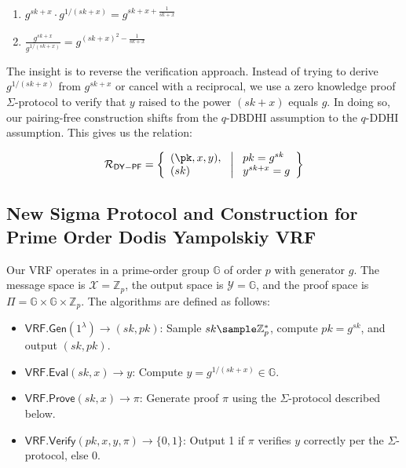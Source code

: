 \begin{enumerate}
    \item $g^{sk+x} \cdot g^{1/(sk+x)} = g^{sk + x + \frac{1}{sk+x}}$
    \item $\frac{g^{sk+x}}{g^{1/(sk+x)}} = g^{(sk+x)^2-\frac{1}{sk+x}}$
\end{enumerate}

The insight is to reverse the verification approach. Instead of trying to derive $g^{1/(sk+x)}$ from $g^{sk+x}$ or cancel with a reciprocal, we use a zero knowledge proof $\Sigma$-protocol to verify that $y$ raised to the power $(sk+x)$ equals $g$. In doing so, our pairing-free construction shifts from the $q$-DBDHI assumption to the $q$-DDHI assumption. This gives us the relation:

\[
\mathcal{R}_{\mathsf{DY-PF}} = \left\{ 
\begin{array}{l} 
(\pk, x, y),\\
(sk) 
\end{array}
\ \middle|
\ \begin{array}{l}
pk = g^{sk} \\
y^{sk + x} = g  \\
\end{array} \right\}
\]

\subsection{New Sigma Protocol and Construction for Prime Order Dodis Yampolskiy VRF}\label{sec-dy-pf}

Our VRF operates in a prime-order group $\mathbb{G}$ of order $p$ with generator $g$. The message space is $\mathcal{X} = \mathbb{Z}_p$, the output space is $\mathcal{Y} = \mathbb{G}$, and the proof space is $\Pi = \mathbb{G} \times \mathbb{G} \times \mathbb{Z}_p$. The algorithms are defined as follows:

\begin{itemize}
    \item $\mathsf{VRF.Gen}(1^\lambda) \to (sk, pk)$: Sample $sk \sample \mathbb{Z}_p^*$, compute $pk = g^{sk}$, and output $(sk, pk)$.
    \item $\mathsf{VRF.Eval}(sk, x) \to y$: Compute $y = g^{1/(sk + x)} \in \mathbb{G}$.
    \item $\mathsf{VRF.Prove}(sk, x) \to \pi$: Generate proof $\pi$ using the $\Sigma$-protocol described below.
    \item $\mathsf{VRF.Verify}(pk, x, y, \pi) \to \{0, 1\}$: Output 1 if $\pi$ verifies $y$ correctly per the $\Sigma$-protocol, else 0.
\end{itemize}

